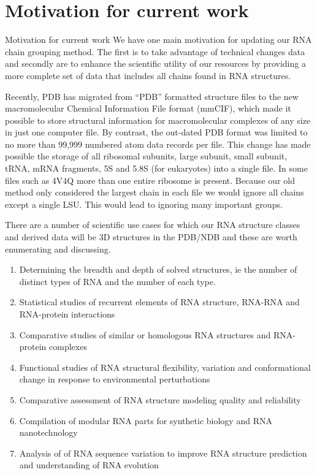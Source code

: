\section{Motivation for current work}

Motivation for current work
We have one main motivation for updating our RNA chain grouping method. The
first is to take advantage of technical changes data and secondly are to enhance
the scientific utility of our resources by providing a more complete set of data
that includes all chains found in RNA structures.

Recently,  PDB has migrated from “PDB” formatted structure files to the new
macromolecular Chemical Information File format (mmCIF), which made it possible
to store structural information for macromolecular complexes of any size in just
one computer file. By contrast, the out-dated PDB format was limited to no more
than 99,999 numbered atom data records per file. This change has made possible
the storage of all ribosomal subunits, large subunit, small subunit, tRNA, mRNA
fragments, 5S and 5.8S (for eukaryotes) into a single file. In some files such
as 4V4Q \cite{Schuwirth2005} more than one entire ribosome is present. Because
our old method only considered the largest chain in each file we would ignore
all chains except a single LSU. This would lead to ignoring many important
groups.

There are a number of scientific use cases for which our RNA structure classes
and derived data will be  3D structures in the PDB/NDB and these are worth
enumerating and discussing.

\begin{enumerate}
  \item Determining the breadth and depth of solved structures, ie the number of
    distinct types of RNA and the number of each type.

  \item Statistical studies of recurrent elements of RNA structure, RNA-RNA and
    RNA-protein interactions

  \item Comparative studies of similar or homologous RNA structures and
    RNA-protein complexes

  \item Functional studies of RNA structural flexibility, variation and
    conformational change in response to environmental perturbations

  \item Comparative assessment of RNA structure modeling quality and reliability

  \item Compilation of modular RNA parts for synthetic biology and RNA
    nanotechnology

  \item Analysis of  of RNA sequence variation to improve RNA structure
    prediction and understanding of RNA evolution
\end{enumerate}


